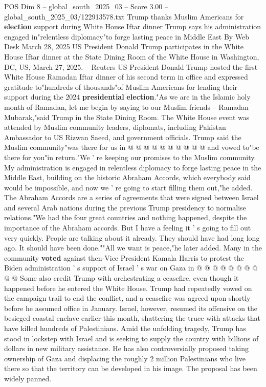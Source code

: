 \begin{textsample}{POS Dim 8 – global\_south\_2025\_03 – Score 3.00 – global\_south\_2025\_03/122913578.txt}  \label{ex:f8_pos_382}
Trump thanks Muslim Americans for \textbf{election} support during White House Iftar dinner Trump says his administration engaged in"relentless diplomacy"to forge lasting peace in Middle East By Web Desk March 28, 2025 US President Donald Trump participates in the White House Iftar dinner at the State Dining Room of the White House in Washington, DC, US, March 27, 2025. -- Reuters US President Donald Trump hosted the first White House Ramadan Iftar dinner of his second term in office and expressed gratitude to"hundreds of thousands"of Muslim Americans for lending their support during the 2024 \textbf{presidential} \textbf{election}."As we are in the Islamic holy month of Ramadan, let me begin by saying to our Muslim friends -- Ramadan Mubarak,"said Trump in the State Dining Room.
The White House event was attended by Muslim community leaders, diplomats, including Pakistan Ambassador to US Rizwan Saeed, and government officials.
Trump said the Muslim community"was there for us in @ @ @ @ @ @ @ @ @ @ and vowed to"be there for you"in return."We ' re keeping our promises to the Muslim community.
My administration is engaged in relentless diplomacy to forge lasting peace in the Middle East, building on the historic Abraham Accords, which everybody said would be impossible, and now we ' re going to start filling them out,"he added.
The Abraham Accords are a series of agreements that were signed between Israel and several Arab nations during the previous Trump presidency to normalise relations."We had the four great countries and nothing happened, despite the importance of the Abraham accords.
But I have a feeling it ' s going to fill out very quickly.
People are talking about it already.
They should have had long long ago.
It should have been done.""All we want is peace,"he later added.
Many in the community \textbf{voted} against then-Vice President Kamala Harris to protest the Biden administration ' s support of Israel ' s war on Gaza in @ @ @ @ @ @ @ @ @ @ Some also credit Trump with orchestrating a ceasefire, even though it happened before he entered the White House.
Trump had repeatedly vowed on the campaign trail to end the conflict, and a ceasefire was agreed upon shortly before he assumed office in January.
Israel, however, resumed its offensive on the besieged coastal enclave earlier this month, shattering the truce with attacks that have killed hundreds of Palestinians.
Amid the unfolding tragedy, Trump has stood in lockstep with Israel and is seeking to supply the country with billions of dollars in new military assistance.
He has also controversially proposed taking ownership of Gaza and displacing the roughly 2 million Palestinians who live there so that the territory can be developed in his image.
The proposal has been widely panned.

\end{textsample}
